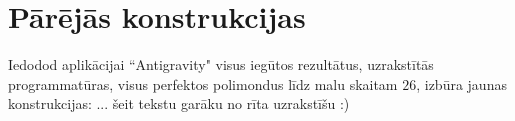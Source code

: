 \documentclass[utf8]{ludis2022}
\begin{document}

    

\section{Pārējās konstrukcijas}

\firstparskip Iedodod aplikācijai ``Antigravity" visus iegūtos rezultātus, uzrakstītās programmatūras, visus perfektos polimondus līdz malu skaitam $26$,  izbūra jaunas konstrukcijas: ... 
šeit tekstu garāku no rīta uzrakstīšu :)
\end{document}
